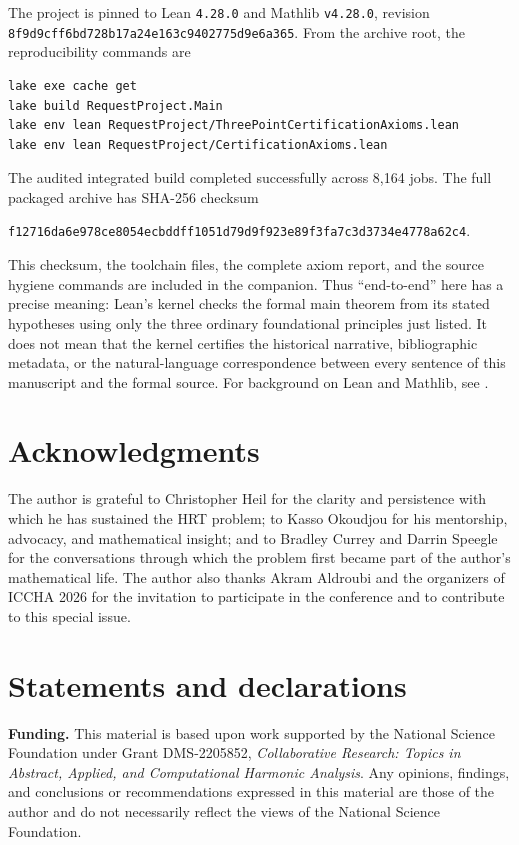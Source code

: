 \documentclass[reqno]{amsart}
\theoremstyle{remark}
\numberwithin{equation}{section}
\begin{document}
The project is pinned to Lean \texttt{4.28.0} and Mathlib \texttt{v4.28.0},
revision \nolinkurl{8f9d9cff6bd728b17a24e163c9402775d9e6a365}. From the archive root, the
reproducibility commands are
\begin{verbatim}
lake exe cache get
lake build RequestProject.Main
lake env lean RequestProject/ThreePointCertificationAxioms.lean
lake env lean RequestProject/CertificationAxioms.lean
\end{verbatim}
The audited integrated build completed successfully across 8,164 jobs. The full packaged
archive has SHA-256 checksum
\begin{center}
\small\nolinkurl{f12716da6e978ce8054ecbddff1051d79d9f923e89f3fa7c3d3734e4778a62c4}.
\end{center}
This checksum, the toolchain files, the complete axiom report, and the source
hygiene commands are included in the companion. Thus ``end-to-end'' here has
a precise meaning: Lean's kernel checks the formal main theorem from its
stated hypotheses using only the three ordinary foundational principles just
listed. It does not mean that the kernel certifies the historical narrative,
bibliographic metadata, or the natural-language correspondence between every
sentence of this manuscript and the formal source. For background on Lean and
Mathlib, see \cite{deMouraUllrich,Mathlib}.

\section*{Acknowledgments}

The author is grateful to Christopher Heil for the clarity and persistence
with which he has sustained the HRT problem; to Kasso Okoudjou for his
mentorship, advocacy, and mathematical insight; and to Bradley Currey and
Darrin Speegle for the conversations through which the problem first became
part of the author's mathematical life. The author also thanks Akram Aldroubi
and the organizers of ICCHA 2026 for the invitation to participate in the
conference and to contribute to this special issue.

\section*{Statements and declarations}

\noindent
\textbf{Funding.}
This material is based upon work supported by the National Science Foundation
under Grant DMS-2205852, \emph{Collaborative Research: Topics in Abstract,
Applied, and Computational Harmonic Analysis}. Any opinions, findings, and
conclusions or recommendations expressed in this material are those of the
author and do not necessarily reflect the views of the National Science
Foundation.
\end{document}
